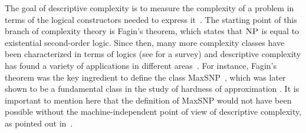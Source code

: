

%
%
%	
%	
%	
%	
%

The goal of descriptive complexity is to measure the complexity of a problem in terms of the logical constructors needed to express it~\cite{immerman1999descriptive}. 
The starting point of this branch of complexity theory is Fagin's theorem, which states that $\text{\sc NP}$ is equal to existential second-order logic. Since then, many more complexity classes have been characterized in terms of logics (see \cite{G07} for a survey) and descriptive complexity has found a variety of applications in different areas~\cite{immerman1999descriptive, L04}.
For instance, Fagin's theorem was the key ingredient to define the class {\sc MaxSNP}~\cite{PY91}, which was later shown to be a fundamental class in the study of hardness of approximation \cite{ALMSS98}. 
It is important to mention here that the definition of {\sc MaxSNP} would not have been possible without the machine-independent point of view of descriptive complexity, as pointed out in~\cite{PY91}.

